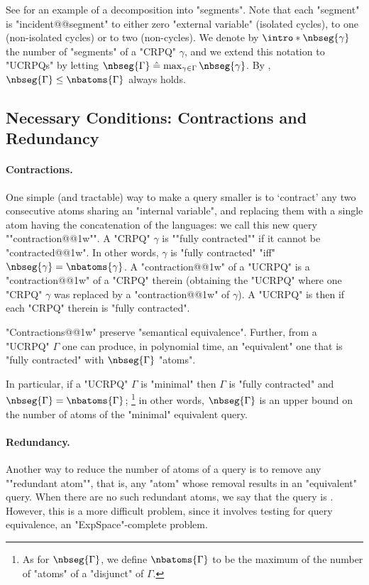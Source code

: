 See  for an example of a decomposition into "segments".
Note that each "segment" is "incident@@segment" to either zero "external variable" (isolated cycles),
to one (non-isolated cycles) or to two (non-cycles).
We denote by \AP$\intro*\nbseg{\gamma}$ the number of "segments" of a "CRPQ" $\gamma$,
and we extend this notation to "UCRPQs" by letting $\nbseg{\Gamma} \defeq
\max_{\gamma \in \Gamma}{\nbseg{\gamma}}$. By , $\nbseg{\Gamma}\leq \nbatoms{\Gamma}$ always holds.

\subsection{Necessary Conditions: Contractions and Redundancy}

\paragraph{Contractions.}
One simple (and tractable) way to make a query smaller is to `contract'
any two consecutive atoms sharing an "internal variable", and replacing them with
a single atom having the concatenation of the languages: we call this
new query \AP""contraction@@1w"".
A "CRPQ" $\gamma$ is \AP""fully contracted"" if it cannot be "contracted@@1w".
In other words, $\gamma$ is "fully contracted" "iff" $\nbseg{\gamma} = \nbatoms{\gamma}$.
A "contraction@@1w" of a "UCRPQ" is a "contraction@@1w" of a "CRPQ" therein (obtaining the "UCRPQ" where one "CRPQ" $\gamma$ was replaced by a "contraction@@1w" of $\gamma$). A "UCRPQ" is then  if each "CRPQ" therein is "fully contracted".

\begin{fact}
	\AP\label{fact:produce-fully-contracted}
	"Contractions@@1w" preserve "semantical equivalence". Further, from a "UCRPQ" $\Gamma$ one can produce, in polynomial time, an "equivalent" one that is "fully contracted" with $\nbseg{\Gamma}$ "atoms".
\end{fact}

In particular, if a "UCRPQ" $\Gamma$ is "minimal" then $\Gamma$ is "fully contracted" and $\nbseg{\Gamma} = \nbatoms{\Gamma}$;%
\footnote{As for $\nbseg{\Gamma}$, we define $\nbatoms{\Gamma}$ to be the maximum
of the number of "atoms" of a "disjunct" of $\Gamma$.}
in other words, $\nbseg{\Gamma}$ is an upper bound on the number of atoms of the "minimal" equivalent query.

\paragraph{Redundancy.}
Another way to reduce the number of atoms of a query is to remove any \AP""redundant atom"", that is, any "atom" whose removal results in an "equivalent" query. 
When there are no such redundant atoms, we say that the query is .
However, this is a more difficult problem, since it involves testing for query equivalence, an "ExpSpace"-complete problem.

